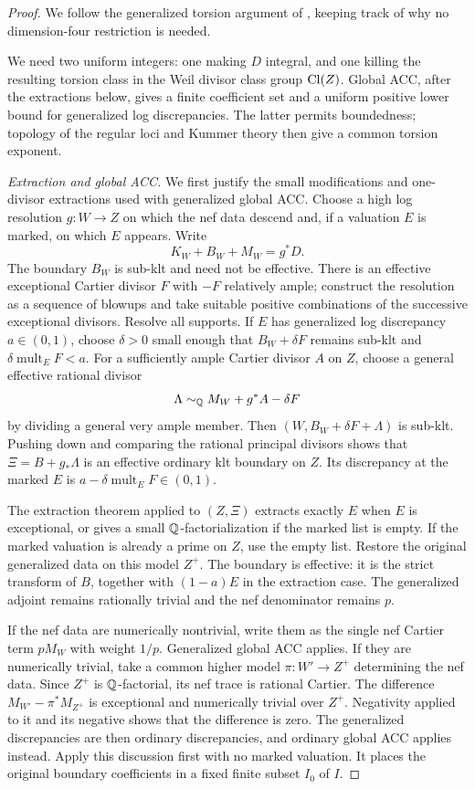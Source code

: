 \begin{proof}
We follow the generalized torsion argument of
\cite[Proposition~7.1]{R4}, keeping track of why no
dimension-four restriction is needed.

We need two uniform integers: one making $D$ integral, and one
killing the resulting torsion class in the Weil divisor class
group $\operatorname{Cl}(Z)$. Global ACC, after the extractions below, gives a
finite coefficient set and a uniform positive lower bound for
generalized log discrepancies. The latter permits boundedness;
topology of the regular loci and Kummer theory then give a common
torsion exponent.

\smallskip\noindent\textit{Extraction and global ACC.}
We first justify the small modifications and one-divisor extractions
used with generalized global ACC.  Choose a high log resolution
$g:W\to Z$ on which the nef data descend and, if a valuation $E$
is marked, on which $E$ appears.  Write
\[
 K_W+B_W+M_W=g^*D.
\]
The boundary $B_W$ is sub-klt and need not be effective.  There is
an effective exceptional Cartier divisor $F$ with $-F$ relatively
ample; construct the resolution as a sequence of blowups and take
suitable positive combinations of the successive exceptional
divisors.  Resolve all supports.  If $E$ has generalized log
discrepancy $a\in(0,1)$, choose $\delta>0$ small enough that
$B_W+\delta F$ remains sub-klt and
$\delta\operatorname{mult}_EF<a$.  For a sufficiently ample
Cartier divisor $A$ on $Z$, choose a general effective rational
divisor
\[
 \Lambda\sim_{\mathbb Q}M_W+g^*A-\delta F
\]
by dividing a general very ample member.  Then
$(W,B_W+\delta F+\Lambda)$ is sub-klt.  Pushing down and
comparing the rational principal divisors shows that
$\Xi=B+g_*\Lambda$ is an effective ordinary klt boundary on
$Z$.  Its discrepancy at the marked $E$ is
$a-\delta\operatorname{mult}_EF\in(0,1)$.

The extraction theorem \cite[Corollary~1.4.3]{BCHM2010} applied to
$(Z,\Xi)$ extracts exactly $E$ when $E$ is exceptional, or gives a
small $\mathbb Q$-factorialization if the marked list is empty.  If the
marked valuation is already a prime on $Z$, use the empty list.
Restore the
original generalized data on this model $Z^+$.  The boundary is
effective: it is the strict transform of $B$, together with
$(1-a)E$ in the extraction case.  The generalized adjoint remains
rationally trivial and the nef denominator remains $p$.

If the nef data are numerically nontrivial, write them as the single
nef Cartier term $pM_W$ with weight $1/p$.  Generalized global ACC
\cite[Theorem~1.6]{BirkarZhang2016} applies.  If they are
numerically trivial, take a common higher model
$\pi:W'\to Z^+$ determining the nef data.  Since $Z^+$ is
$\mathbb Q$-factorial, its nef trace is rational Cartier.  The difference
$M_{W'}-\pi^*M_{Z^+}$ is exceptional and numerically trivial over
$Z^+$.  Negativity applied to it and its negative shows that the
difference is zero.  The generalized discrepancies are then
ordinary discrepancies, and ordinary global ACC
\cite[Theorem~1.5]{HMX2014} applies instead.  Apply this discussion
first with no marked valuation.  It places the original boundary
coefficients in a fixed finite subset $I_0$ of $I$.


\end{proof}
